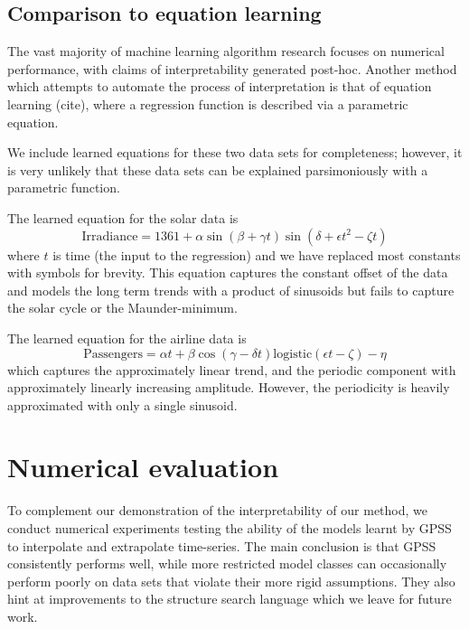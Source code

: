 \documentclass{article}
\begin{document}
\subsection{Comparison to equation learning}

The vast majority of machine learning algorithm research focuses on numerical performance, with claims of interpretability generated post-hoc.
Another method which attempts to automate the process of interpretation is that of equation learning (cite), where a regression function is described via a parametric equation.

We include learned equations for these two data sets for completeness; however, it is very unlikely that these data sets can be explained parsimoniously with a parametric function.

The learned equation for the solar data is
\begin{equation}
\textrm{Irradiance} = 1361 + \alpha\sin(\beta + \gamma t)\sin(\delta + \epsilon t^2 - \zeta t)
\end{equation}
where $t$ is time (the input to the regression) and we have replaced most constants with symbols for brevity.
This equation captures the constant offset of the data and models the long term trends with a product of sinusoids but fails to capture the solar cycle or the Maunder-minimum.

The learned equation for the airline data is
\begin{equation}
\textrm{Passengers} = \alpha t + \beta\cos(\gamma - \delta t)\textrm{logistic}(\epsilon t - \zeta) - \eta
\end{equation}
which captures the approximately linear trend, and the periodic component with approximately linearly increasing amplitude.
However, the periodicity is heavily approximated with only a single sinusoid.

\section{Numerical evaluation}
\label{sec:numerical}

To complement our demonstration of the interpretability of our method, we conduct numerical experiments testing the ability of the models learnt by GPSS to interpolate and extrapolate time-series.
The main conclusion is that GPSS consistently performs well, while more restricted model classes can occasionally perform poorly on data sets that violate their more rigid assumptions.
They also hint at improvements to the structure search language which we leave for future work.
\end{document}
